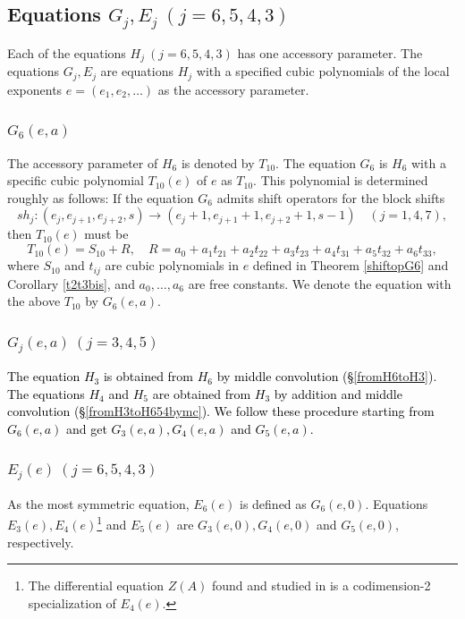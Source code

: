 \documentclass[a4paper,12pt]{article}
\theoremstyle{definition}
\theoremstyle{remark}
\numberwithin{equation}{section} %
\newcommand{\blue}[1]{\textcolor{black}{#1}}
\begin{document}
\subsection{Equations $G_j, E_j\ (j=6,5,4,3)$}
Each of the equations $H_j\ (j=6,5,4,3)$ has one accessory parameter.
The equations $G_j, E_j$ are equations $H_j$ with a specified cubic polynomials of the local exponents $e=(e_1,e_2,\dots)$ as the accessory parameter.
\subsubsection{$G_6(e,a)$}
The accessory parameter of $H_6$ is denoted by $T_{10}$. The equation $G_6$ is $H_6$ with a specific cubic polynomial $T_{10}(e)$ of $e$ as $T_{10}$. This polynomial is determined roughly as follows:
%
If the equation $G_6$ admits  shift operators for the  block shifts
   $$sh_j:(e_j,e_{j+1},e_{j+2},s)\to(e_j+1,e_{j+1}+1,e_{j+2}+1,s-1)\quad (j=1,4,7),$$ then $T_{10}(e)$ must be 
  $$T_{10}(e)=S_{10}+R,\quad R=a_0+a_1t_{21}+a_2t_{22}+a_3t_{23}+a_4t_{31}+a_5t_{32}+a_6t_{33},$$
   where $S_{10}$ and $t_{ij}$ are cubic polynomials in $e$ defined in Theorem \ref{shiftopG6} and Corollary \ref{t2t3bis}, and $a_0,\dots,a_6$ are free constants. We denote the equation with the above $T_{10}$ by $G_6(e,a)$.
   \subsubsection{$G_j(e,a)\ (j=3,4,5)$}
 \blue{  The equation $H_3$ is obtained from $H_6$ by middle convolution (\S \ref{fromH6toH3}). The equations $H_4$ and $H_5$ are obtained from $H_3$ by addition and middle convolution (\S \ref{fromH3toH654bymc}). We follow these procedure starting from $G_6(e,a)$ and get $G_3(e,a),G_4(e,a)$ and $G_5(e,a)$.}
   \subsubsection{$E_j(e)\ (j=6,5,4,3)$} As the most symmetric equation, $E_6(e)$ is defined as $G_6(e,0)$. Equations $E_3(e),E_4(e)$\footnote{The differential equation $Z(A)$ found and  studied in \cite{Z12} is a codimension-2 specialization of $E_4(e)$.}  and $E_5(e)$ are $G_3(e,0),G_4(e,0)$ and $G_5(e,0)$, respectively.
   






\newpage
\adjuststc
\end{document}
